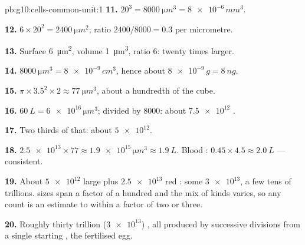 \begin{solution}{pb:g10:cells-common-unit:1}
\textbf{11.} $20^3 = \qty{8000}{\micro m^3} = \num{8e-6}\,\unit{mm^3}$.

\textbf{12.} $6 \times 20^2 = \qty{2400}{\micro m^2}$; ratio
$2400/8000 = 0.3$ per micrometre.

\textbf{13.} Surface \qty{6}{\micro m^2}, volume \qty{1}{\micro m^3},
ratio 6: twenty times larger.

\textbf{14.} $\qty{8000}{\micro m^3} = \num{8e-9}\,\unit{cm^3}$, hence
about $\num{8e-9}\,\unit{g} = \qty{8}{ng}$.

\textbf{15.} $\pi \times 3.5^2 \times 2 \approx \qty{77}{\micro m^3}$,
about a hundredth of the cube.

\textbf{16.} $\qty{60}{L} = \num{6e16}\,\unit{\micro m^3}$; divided by
8000: about $\num{7.5e12}$ .

\textbf{17.} Two thirds of that: about $\num{5e12}$.

\textbf{18.} $\num{2.5e13} \times 77 \approx \num{1.9e15}\,\unit{\micro
m^3} \approx \qty{1.9}{L}$. Blood : $0.45 \times 4.5 \approx
\qty{2.0}{L}$ --- consistent.

\textbf{19.} About $\num{5e12}$ large  plus $\num{2.5e13}$ red
: some $\num{3e13}$, a few tens of trillions.  sizes span a
factor of a hundred and the mix of kinds varies, so any count is an
estimate to within a factor of two or three.

\textbf{20.} Roughly thirty trillion ($\num{3e13}$) , all
produced by successive  divisions from a single starting , the
fertilised egg.
\end{solution}
